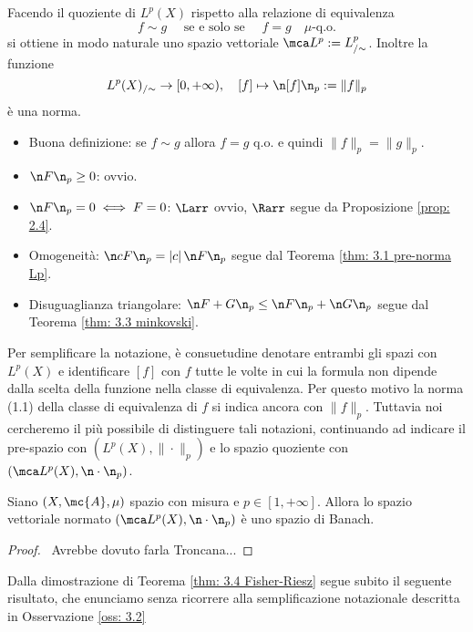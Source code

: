 \begin{oss}\label{oss: 3.2}
    Facendo il quoziente di $ L^{p}(X)$ rispetto alla relazione di equivalenza
    \[
    f \sim g \quad \text { se e solo se }\quad  f=g\quad \mu\text{-q.o.}
    \]
    si ottiene in modo naturale uno spazio vettoriale $\mca L^p:= L^p_{/\sim}$. Inoltre la funzione
    \[
     L^{p}(X)_{/\sim}\rightarrow[0,+\infty), \quad[f] \mapsto \n [f]\n_{p}:=\|f\|_{p}
    \]
    è una norma.
    \begin{itemize}
        \item Buona definizione: se $f \sim g$ allora $f=g$ q.o. e quindi $\|f\|_p = \|g\|_p$.
        \item $\n F\n_p \geq 0$: ovvio.
        \item $\n F\n_p = 0 \iff F = 0$: $\Larr$ ovvio, $\Rarr$ segue da Proposizione \ref{prop: 2.4}.
        \item Omogeneità: $\n cF\n_p = |c|\,\n F\n_p$ segue dal Teorema \ref{thm: 3.1 pre-norma Lp}.
        \item Disuguaglianza triangolare: $\n F + G\n_p \leq \n F\n_p + \n G\n_p$ segue dal Teorema \ref{thm: 3.3 minkovski}.
    \end{itemize}
\end{oss}
Per semplificare la notazione, è consuetudine denotare entrambi gli spazi con $L^{p}(X)$ e identificare $[f]$ con $f$ tutte le volte in cui la formula non dipende dalla scelta della funzione nella classe di equivalenza. Per questo motivo la norma (1.1) della classe di equivalenza di $f$ si indica ancora con $\|f\|_{p}$. Tuttavia noi cercheremo il più possibile di distinguere tali notazioni, continuando ad indicare il pre-spazio con $( L^{p}(X),\|\cdot\|_{p})$ e lo spazio quoziente con $(\mca L^{p}(X),\n\cdot\n_{p})$.

\begin{shadedTheorem}\label{thm: 3.4 Fisher-Riesz}
    Siano $(X, \mc{A}, \mu)$ spazio con misura e $p \in[1,+\infty]$. Allora lo spazio vettoriale normato $\left(\mca L^{p}(X),\n\cdot\n_{p}\right)$ è uno spazio di Banach.
\end{shadedTheorem}
\begin{proof}
    \TODO\ Avrebbe dovuto farla Troncana...
\end{proof}

Dalla dimostrazione di Teorema \ref{thm: 3.4 Fisher-Riesz} segue subito il seguente risultato, che enunciamo senza ricorrere alla semplificazione notazionale descritta in Osservazione \ref{oss: 3.2}

